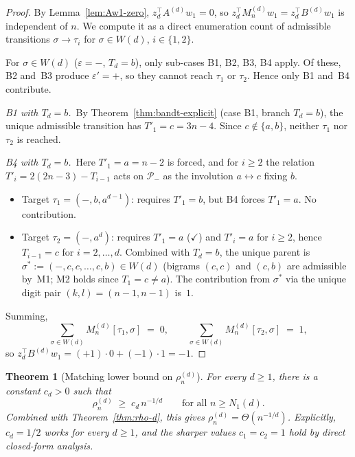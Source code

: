\documentclass{amsart}
\newtheorem{theorem}{Theorem}[section]
\theoremstyle{definition}
\theoremstyle{remark}
\begin{document}
\begin{proof}
By Lemma~\ref{lem:Aw1-zero}, $z_d^\top A^{(d)} w_1 = 0$, so
$z_d^\top M_n^{(d)} w_1 = z_d^\top B^{(d)} w_1$ is independent of
$n$.  We compute it as a direct enumeration count of admissible
transitions $\sigma \to \tau_i$ for $\sigma \in W(d)$, $i \in
\{1, 2\}$.

For $\sigma \in W(d)$ ($\varepsilon = -$, $T_d = b$), only
sub-cases B1, B2, B3, B4 apply.  Of these, B2 and~B3 produce
$\varepsilon' = +$, so they cannot reach $\tau_1$ or $\tau_2$.
Hence only B1 and~B4 contribute.

\smallskip\noindent\emph{B1 with $T_d = b$.}\
By Theorem~\ref{thm:bandt-explicit} (case B1, branch $T_d = b$),
the unique admissible transition has $T'_1 = c = 3n - 4$.  Since
$c \notin \{a, b\}$, neither $\tau_1$ nor $\tau_2$ is reached.

\smallskip\noindent\emph{B4 with $T_d = b$.}\
Here $T'_1 = a = n-2$ is forced, and for $i \ge 2$ the relation
$T'_i = 2(2n-3) - T_{i-1}$ acts on $\mathcal{P}_-$ as the
involution $a \leftrightarrow c$ fixing $b$.
\begin{itemize}
\item Target $\tau_1 = (-, b, a^{d-1})$: requires $T'_1 = b$, but
  B4 forces $T'_1 = a$.  No contribution.
\item Target $\tau_2 = (-, a^d)$: requires $T'_1 = a$ ($\checkmark$)
  and $T'_i = a$ for $i \ge 2$, hence $T_{i-1} = c$ for
  $i = 2, \ldots, d$.  Combined with $T_d = b$, the unique parent
  is $\sigma^* := (-, c, c, \ldots, c, b) \in W(d)$
  (bigrams $(c, c)$ and $(c, b)$ are admissible by~M1; M2 holds
  since $T_1 = c \neq a$).  The contribution from $\sigma^*$ via
  the unique digit pair $(k, l) = (n-1, n-1)$ is~$1$.
\end{itemize}

Summing,
\[
  \sum_{\sigma \in W(d)} M_n^{(d)}[\tau_1, \sigma] \;=\; 0,
  \qquad
  \sum_{\sigma \in W(d)} M_n^{(d)}[\tau_2, \sigma] \;=\; 1,
\]
so $z_d^\top B^{(d)} w_1 = (+1)\cdot 0 + (-1)\cdot 1 = -1$.
\end{proof}

\begin{theorem}[Matching lower bound on $\rho_n^{(d)}$]
\label{thm:rho-d-lower}
For every $d \ge 1$, there is a constant $c_d > 0$ such that
\begin{equation}\label{eq:rho-d-lower}
  \rho_n^{(d)} \;\ge\; c_d\, n^{-1/d}
  \qquad \text{for all } n \ge N_1(d).
\end{equation}
Combined with Theorem~\ref{thm:rho-d}, this gives
$\rho_n^{(d)} = \Theta(n^{-1/d})$.  Explicitly, $c_d = 1/2$
works for every $d \ge 1$, and the sharper values
$c_1 = c_2 = 1$ hold by direct closed-form analysis.
\end{theorem}
\end{document}
